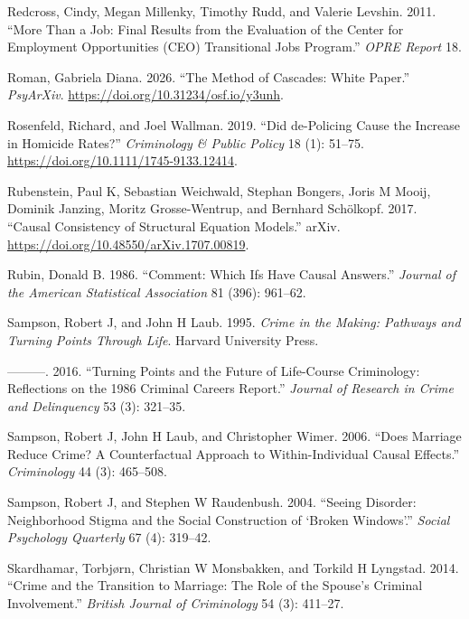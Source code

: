 \documentclass[
  letterpaper,
  DIV=11,
  numbers=noendperiod]{scrartcl}
\newlength{\cslhangindent}
\newenvironment{CSLReferences}[2] %
 {\begin{list}{}{%
  \setlength{\itemindent}{0pt}
  \setlength{\leftmargin}{0pt}
  \setlength{\parsep}{0pt}
  \ifodd #1
   \setlength{\leftmargin}{\cslhangindent}
   \setlength{\itemindent}{-1\cslhangindent}
  \fi
  \setlength{\itemsep}{#2\baselineskip}}}
 {\end{list}}
\begin{document}
\begin{CSLReferences}{1}{0}
Redcross, Cindy, Megan Millenky, Timothy Rudd, and Valerie Levshin.
2011. {``More Than a Job: Final Results from the Evaluation of the
Center for Employment Opportunities (CEO) Transitional Jobs Program.''}
\emph{OPRE Report} 18.

Roman, Gabriela Diana. 2026. {``The Method of Cascades: White Paper.''}
\emph{PsyArXiv}. \url{https://doi.org/10.31234/osf.io/y3unh}.

Rosenfeld, Richard, and Joel Wallman. 2019. {``Did de{-}Policing Cause
the Increase in Homicide Rates?''} \emph{Criminology \& Public Policy}
18 (1): 51--75. \url{https://doi.org/10.1111/1745-9133.12414}.

Rubenstein, Paul K, Sebastian Weichwald, Stephan Bongers, Joris M Mooij,
Dominik Janzing, Moritz Grosse-Wentrup, and Bernhard Schölkopf. 2017.
{``Causal Consistency of Structural Equation Models.''} arXiv.
\url{https://doi.org/10.48550/arXiv.1707.00819}.

Rubin, Donald B. 1986. {``Comment: Which Ifs Have Causal Answers.''}
\emph{Journal of the American Statistical Association} 81 (396):
961--62.

Sampson, Robert J, and John H Laub. 1995. \emph{Crime in the Making:
Pathways and Turning Points Through Life}. Harvard University Press.

---------. 2016. {``Turning Points and the Future of Life-Course
Criminology: Reflections on the 1986 Criminal Careers Report.''}
\emph{Journal of Research in Crime and Delinquency} 53 (3): 321--35.

Sampson, Robert J, John H Laub, and Christopher Wimer. 2006. {``Does
Marriage Reduce Crime? A Counterfactual Approach to Within-Individual
Causal Effects.''} \emph{Criminology} 44 (3): 465--508.

Sampson, Robert J, and Stephen W Raudenbush. 2004. {``Seeing Disorder:
Neighborhood Stigma and the Social Construction of {`Broken
Windows'}.''} \emph{Social Psychology Quarterly} 67 (4): 319--42.

Skardhamar, Torbjørn, Christian W Monsbakken, and Torkild H Lyngstad.
2014. {``Crime and the Transition to Marriage: The Role of the Spouse's
Criminal Involvement.''} \emph{British Journal of Criminology} 54 (3):
411--27.


\end{CSLReferences}
\end{document}
